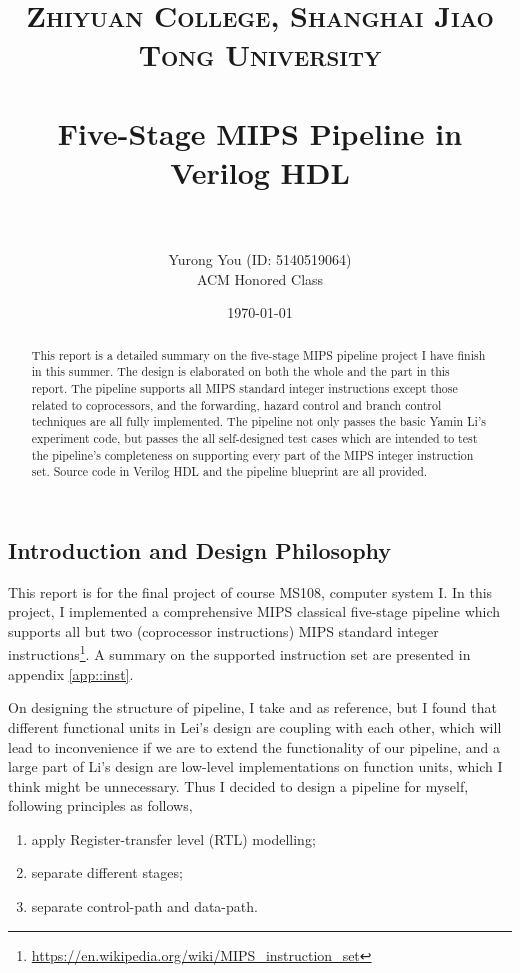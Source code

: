 \documentclass[paper=a4, fontsize=11pt]{scrartcl} %
\title{	
\normalfont \normalsize 
\textsc{Zhiyuan College, Shanghai Jiao Tong University} \\ %
\horrule{0.5pt} \\[0.4cm] %
\huge Five-Stage MIPS Pipeline in Verilog HDL \\ %
\horrule{2pt} \\ %
}
\author{
\normalsize
	Yurong You (ID: 5140519064)\\
\normalsize
	ACM Honored Class
} %
\date{\normalsize\today} %
\numberwithin{equation}{section} %
\numberwithin{figure}{section} %
\numberwithin{table}{section} %
\begin{document}
\maketitle %
\begin{spacing}{1.5}
\renewcommand{\abstractname}{\scshape \bfseries \large Abstract}
\begin{abstract}
	This report is a detailed summary on the five-stage MIPS pipeline project I have finish in this summer. The design is elaborated on both the whole and the part in this report. The pipeline supports all MIPS standard integer instructions except those related to coprocessors, and the forwarding, hazard control and branch control techniques are all fully implemented. The pipeline not only passes the basic Yamin Li's experiment code, but passes the all self-designed test cases which are intended to test the pipeline's completeness on supporting every part of the MIPS integer instruction set. Source code in Verilog HDL and the pipeline blueprint are all provided.
\end{abstract}
\newpage
\renewcommand{\contentsname}{\scshape \bfseries \Large Contents}
\tableofcontents

\newpage
\section{Introduction and Design Philosophy}
	This report is for the final project of course MS108, computer system I. In this project, I implemented a comprehensive MIPS classical five-stage pipeline which supports all but two (coprocessor instructions) MIPS standard integer instructions\footnote{\url{https://en.wikipedia.org/wiki/MIPS_instruction_set}}. A summary on the supported instruction set are presented in appendix \ref{app::inst}.
	
	On designing the structure of pipeline, I take \cite{lsl} and \cite{lym} as reference, but I found that different functional units in Lei's design are coupling with each other, which will lead to inconvenience if we are to extend the functionality of our pipeline, and a large part of Li's design are low-level implementations on function units, which I think might be unnecessary. Thus I decided to design a pipeline for myself, following principles as follows,
	
	\begin{spacing}{1.0}
	\begin{enumerate}
		\item apply Register-transfer level (RTL) modelling;
		\item separate different stages;
		\item separate control-path and data-path.
	\end{enumerate}
	\end{spacing}
	

\end{spacing}
\end{document}
